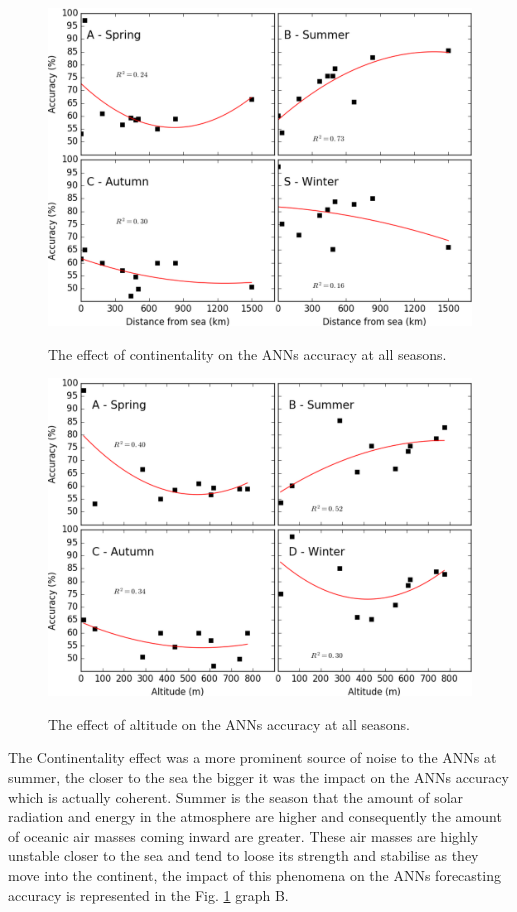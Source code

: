 \begin{figure}[htb!]
 \centering
  \caption{The effect of continentality on the ANNs accuracy at all seasons.}
 \includegraphics[scale=0.56]{capitulo_3/continentality_effect}
 \label{img:figure7}
\end{figure}
\begin{figure}[htb!]
 \centering
  \caption{The effect of altitude on the ANNs accuracy at all seasons.}
 \includegraphics[scale=0.56]{capitulo_3/topographic_effect}
 \label{img:figure8}
\end{figure}

\newpage
The Continentality effect was a more prominent source of noise to the ANNs at summer, the closer to the sea the bigger it was the impact on the ANNs accuracy which is actually coherent. Summer is the season that the amount of solar radiation and energy in the atmosphere are higher and consequently the amount of oceanic air masses coming inward are greater. These air masses are highly unstable closer to the sea and tend to loose its strength and stabilise as they move into the continent, the impact of this phenomena on the ANNs forecasting accuracy is represented in the Fig. \ref{img:figure7} graph B.

